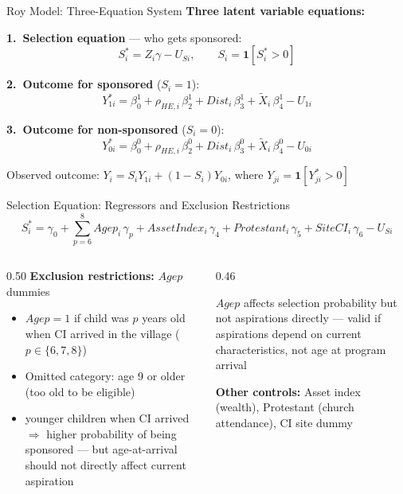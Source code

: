 \documentclass[aspectratio=169, 10pt]{beamer}
\begin{document}
\begin{frame}{Roy Model: Three-Equation System}
  \textbf{Three latent variable equations:}

  \vspace{0.4em}
  \textbf{1.\ Selection equation} — who gets sponsored:
  \[
    S^*_i = Z_i\gamma - U_{Si}, \qquad S_i = \mathbf{1}[S^*_i > 0]
  \]

  \textbf{2.\ Outcome for sponsored} ($S_i=1$):
  \[
    Y^*_{1i} = \beta^1_0 + \rho_{HE,i}\,\beta^1_2 + \mathit{Dist}_i\,\beta^1_3 + \tilde{X}_i\,\beta^1_4 - U_{1i}
  \]

  \textbf{3.\ Outcome for non-sponsored} ($S_i=0$):
  \[
    Y^*_{0i} = \beta^0_0 + \rho_{HE,i}\,\beta^0_2 + \mathit{Dist}_i\,\beta^0_3 + \tilde{X}_i\,\beta^0_4 - U_{0i}
  \]

  \vspace{0.3em}
  Observed outcome: $Y_i = S_i Y_{1i} + (1-S_i)Y_{0i}$, where $Y_{ji} = \mathbf{1}[Y^*_{ji}>0]$
\end{frame}

\begin{frame}{Selection Equation: Regressors and Exclusion Restrictions}
  \[
    S^*_i = \gamma_0 + \sum_{p=6}^{8} \mathit{Age}p_i\,\gamma_p + \mathit{AssetIndex}_i\,\gamma_4 + \mathit{Protestant}_i\,\gamma_5 + \mathit{SiteCI}_i\,\gamma_6 - U_{Si}
  \]

  \vspace{0.4em}
  \begin{columns}
    \begin{column}{0.50\textwidth}
      \textbf{Exclusion restrictions:} $\mathit{Agep}$ dummies
      \begin{itemize}
        \item $\mathit{Agep} = 1$ if child was $p$ years old when CI arrived in the village ($p \in \{6,7,8\}$)
        \item Omitted category: age 9 or older (too old to be eligible)
        \item {} younger children when CI arrived $\Rightarrow$ higher probability of being sponsored — but age-at-arrival should not directly affect current aspiration
      \end{itemize}
    \end{column}
    \begin{column}{0.46\textwidth}
      \begin{assumptionbox}
        $\mathit{Agep}$ affects selection probability but not aspirations directly — valid if aspirations depend on current characteristics, not age at program arrival
      \end{assumptionbox}
      \vspace{0.3em}
      \textbf{Other controls:} Asset index (wealth), Protestant (church attendance), CI site dummy
    \end{column}
  \end{columns}
\end{frame}
\end{document}
